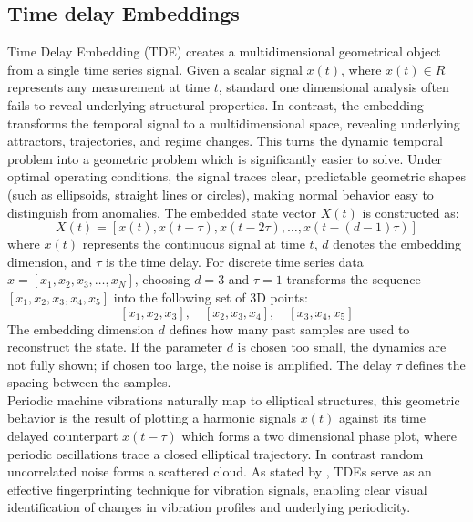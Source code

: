 \subsection{Time delay Embeddings}
Time Delay Embedding (TDE) creates a multidimensional geometrical object from a single time series signal. Given a scalar signal $x(t)$, where $x(t) \in {R}$ represents any measurement at time $t$, standard one dimensional analysis often fails to reveal underlying structural properties. In contrast, the embedding transforms the temporal signal to a multidimensional space, revealing underlying attractors, trajectories, and regime changes. This turns the dynamic temporal problem into a geometric problem which is significantly easier to solve. Under optimal operating conditions, the signal traces clear, predictable geometric shapes (such as ellipsoids, straight lines or circles), making normal behavior easy to distinguish from anomalies. The embedded state vector $X(t)$ is constructed as:
$$X(t) = [x(t), x(t - \tau), x(t - 2\tau), \dots, x(t - (d - 1)\tau)]$$
where $x(t)$ represents the continuous signal at time $t$, $d$ denotes the embedding dimension, and $\tau$ is the time delay. 
For discrete time series data $x = [x_1, x_2, x_3, \dots, x_N]$, choosing $d = 3$ and $\tau = 1$ transforms the sequence $[x_1, x_2, x_3, x_4, x_5]$ into the following set of 3D points:
$$[x_1, x_2, x_3], \quad [x_2, x_3, x_4], \quad [x_3, x_4, x_5]$$
The embedding dimension $d$ defines how many past samples are used to reconstruct the state. If the parameter $d$ is chosen too small, the dynamics are not fully shown; if chosen too large, the noise is amplified. The delay $\tau$ defines the spacing between the samples. \\
Periodic machine vibrations naturally map to elliptical structures, this geometric behavior is the result of plotting a harmonic signals $x(t)$ against its time delayed counterpart $x(t - \tau)$ which forms a two dimensional phase plot, where periodic oscillations trace a closed elliptical trajectory. In contrast random uncorrelated noise forms a scattered cloud.
As stated by \textcite[p.~4]{rakuschek2025visual}, TDEs serve as an effective fingerprinting technique for vibration signals, enabling clear visual identification of changes in vibration profiles and underlying periodicity.